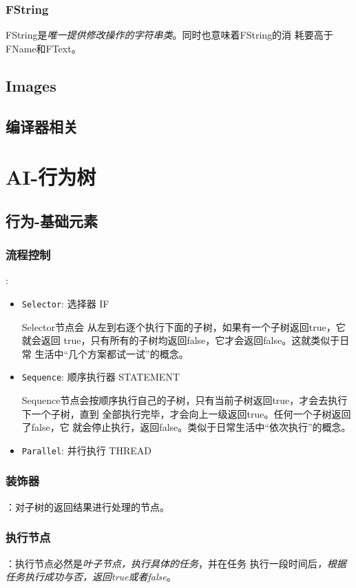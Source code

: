 \documentclass[UTF8,a4paper,12pt]{ctexbook}
\begin{document}
		\subsection{FString}
			FString是\textit{唯一提供修改操作的字符串类}。同时也意味着FString的消 耗要高于FName和FText。
		
	\section{Images}
	
	
	\section{编译器相关}
	

\chapter{AI-行为树}
	\section{行为-基础元素}
	
		\subsection{流程控制}:
			\begin{itemize}
				\item \verb|Selector|: 选择器 IF
				
					Selector节点会 从左到右逐个执行下面的子树，如果有一个子树返回true，它就会返回 true，只有所有的子树均返回false，它才会返回false。这就类似于日常 生活中“几个方案都试一试”的概念。
				\item \verb|Sequence|: 顺序执行器 STATEMENT
				
					Sequence节点会按顺序执行自己的子树，只有当前子树返回true，才会去执行下一个子树，直到 全部执行完毕，才会向上一级返回true。任何一个子树返回了false，它 就会停止执行，返回false。类似于日常生活中“依次执行”的概念。
				\item \verb|Parallel|: 并行执行 THREAD
			\end{itemize}
		
		\subsection{装饰器}：对子树的返回结果进行处理的节点。	
		
		\subsection{执行节点}：执行节点必然是\textit{叶子节点，执行具体的任务}，并在任务 执行一段时间后\textit{，根据任务执行成功与否，返回true或者false}。
	
\end{document}
